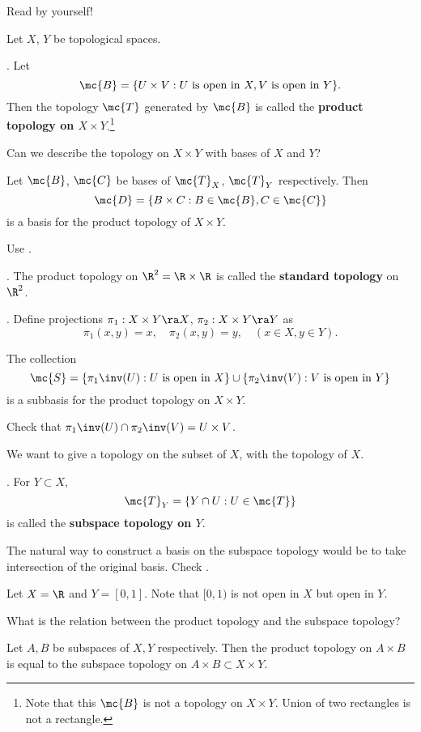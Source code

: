 Read by yourself!


Let \(X\), \(Y\) be topological spaces.

.  Let
\[
    \mc{B} = \{U \times V: U \text{ is open in } X, V \text{ is open in } Y\}.
\]
Then the topology \(\mc{T}\) generated by \(\mc{B}\) is called the \textbf{product topology on \(X \times Y\)}.\footnote{Note that this \(\mc{B}\) is not a topology on \(X \times Y\). Union of two rectangles is not a rectangle.}

Can we describe the topology on \(X \times Y\) with bases of \(X\) and \(Y\)?

 Let \(\mc{B}\), \(\mc{C}\) be bases of \(\mc{T}_X\), \(\mc{T}_Y\) respectively. Then
\[
    \mc{D} = \{B\times C : B\in \mc{B}, C \in \mc{C}\}
\]
is a basis for the product topology of \(X \times Y\).

\pf Use .

\ex. The product topology on \(\R^2 = \R \times \R\) is called the \textbf{standard topology} on \(\R^2\).

. Define projections \(\pi_1 : X\times Y \ra X\), \(\pi_2 : X\times Y \ra Y\) as
\[
    \pi_1(x, y) = x, \quad \pi_2(x, y) = y, \quad (x \in X, y\in Y).
\]

 The collection
\[
    \mc{S} = \{\pi_1\inv(U): U \text{ is open in } X\} \cup \{\pi_2\inv(V) : V \text { is open in } Y\}
\]
is a subbasis for the product topology on \(X\times Y\).

\pf Check that \(\pi_1\inv(U) \cap \pi_2\inv(V) = U \times V\).


We want to give a topology on the subset of \(X\), with the topology of \(X\).

. For \(Y \subset X\),
\[
    \mc{T}_Y = \{Y \cap U : U \in \mc{T}\}
\]
is called the \textbf{subspace topology on \(Y\)}.

The natural way to construct a basis on the subspace topology would be to take intersection of the original basis. Check .

\rmk Let \(X = \R\) and \(Y = [0, 1]\). Note that \([0, 1)\) is not open in \(X\) but open in \(Y\).

What is the relation between the product topology and the subspace topology?

 Let \(A, B\) be subspaces of \(X, Y\) respectively. Then the product topology on \(A \times B\) is equal to the subspace topology on \(A \times B \subset X \times Y\).

